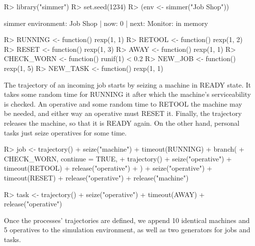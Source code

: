 \documentclass[
  nojss]{jss}
\begin{document}
\begin{CodeChunk}
\begin{CodeInput}
R> library("simmer")
R> set.seed(1234)
R> (env <- simmer("Job Shop"))
\end{CodeInput}
\begin{CodeOutput}
simmer environment: Job Shop | now: 0 | next: 
{ Monitor: in memory }
\end{CodeOutput}
\begin{CodeInput}
R> RUNNING <- function() rexp(1, 1)
R> RETOOL <- function() rexp(1, 2)
R> RESET <- function() rexp(1, 3)
R> AWAY <- function() rexp(1, 1)
R> CHECK_WORN <- function() runif(1) < 0.2
R> NEW_JOB <- function() rexp(1, 5)
R> NEW_TASK <- function() rexp(1, 1)
\end{CodeInput}
\end{CodeChunk}

The trajectory of an incoming job starts by seizing a machine in READY
state. It takes some random time for RUNNING it after which the
machine's serviceability is checked. An operative and some random time
to RETOOL the machine may be needed, and either way an operative must
RESET it. Finally, the trajectory releases the machine, so that it is
READY again. On the other hand, personal tasks just seize operatives for
some time.

\begin{CodeChunk}
\begin{CodeInput}
R> job <- trajectory() %
+   seize("machine") %
+   timeout(RUNNING) %
+   branch(
+     CHECK_WORN, continue = TRUE,
+     trajectory() %
+       seize("operative") %
+       timeout(RETOOL) %
+       release("operative")
+   ) %
+   seize("operative") %
+   timeout(RESET) %
+   release("operative") %
+   release("machine")
\end{CodeInput}
\end{CodeChunk}

\begin{CodeChunk}
\begin{CodeInput}
R> task <- trajectory() %
+   seize("operative") %
+   timeout(AWAY) %
+   release("operative")
\end{CodeInput}
\end{CodeChunk}

Once the processes' trajectories are defined, we append 10 identical
machines and 5 operatives to the simulation environment, as well as two
generators for jobs and tasks.
\end{document}
